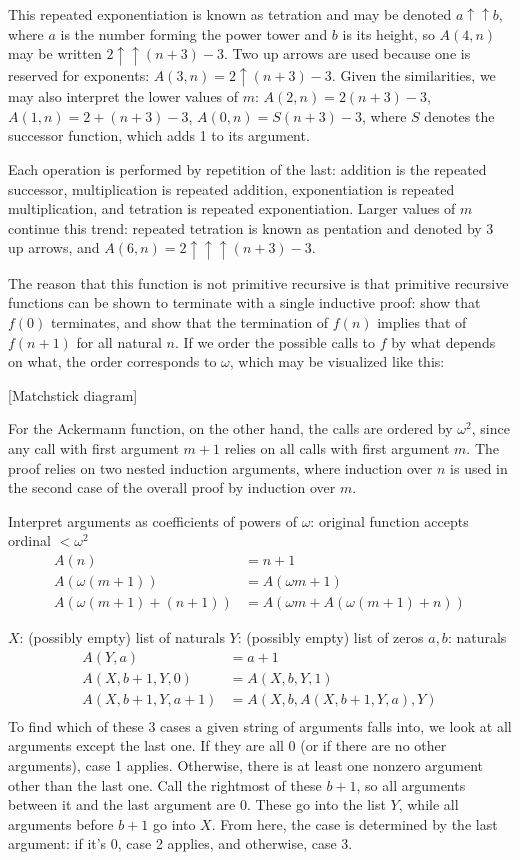 \documentclass{article}
\begin{document}
This repeated exponentiation is known as tetration
and may be denoted $a \uparrow \uparrow b$,
where $a$ is the number forming the power tower
and $b$ is its height,
so $A(4, n)$ may be written $2\uparrow\uparrow(n+3)-3$.
Two up arrows are used because one is reserved for exponents:
$A(3, n) = 2\uparrow(n+3)-3$.
Given the similarities,
we may also interpret the lower values of $m$:
$A(2, n) = 2(n+3)-3$, $A(1, n) = 2+(n+3)-3$, $A(0, n) = S(n+3)-3$,
where $S$ denotes the successor function,
which adds 1 to its argument.

Each operation is performed by repetition of the last:
addition is the repeated successor,
multiplication is repeated addition,
exponentiation is repeated multiplication,
and tetration is repeated exponentiation.
Larger values of $m$ continue this trend:
repeated tetration is known as pentation and denoted by 3 up arrows,
and $A(6, n) = 2\uparrow\uparrow\uparrow(n+3)-3$.

The reason that this function is not primitive recursive
is that primitive recursive functions can be shown to terminate with a single inductive proof:
show that $f(0)$ terminates,
and show that the termination of $f(n)$ implies that of $f(n+1)$ for all natural $n$.
If we order the possible calls to $f$ by what depends on what,
the order corresponds to $\omega$,
which may be visualized like this:

[Matchstick diagram]

For the Ackermann function, on the other hand,
the calls are ordered by $\omega^2$,
since any call with first argument $m+1$
relies on all calls with first argument $m$.
The proof relies on two nested induction arguments,
where induction over $n$ is used in the second case
of the overall proof by induction over $m$.

Interpret arguments as coefficients of powers of $\omega$:
original function accepts ordinal $<\omega^2$
\begin{align*}
  A(n) &= n+1 \\
  A(\omega(m+1)) &= A(\omega m+1) \\
  A(\omega(m+1)+(n+1)) &= A(\omega m+A(\omega(m+1)+n))
\end{align*}

$X$: (possibly empty) list of naturals
$Y$: (possibly empty) list of zeros
$a, b$: naturals
\begin{align*}
  A(Y, a) &= a+1 \\
  A(X, b+1, Y, 0) &= A(X, b, Y, 1) \\
  A(X, b+1, Y, a+1) &= A(X, b, A(X, b+1, Y, a), Y) \\
\end{align*}
To find which of these 3 cases a given string of arguments falls into,
we look at all arguments except the last one.
If they are all 0 (or if there are no other arguments), case 1 applies.
Otherwise, there is at least one nonzero argument other than the last one.
Call the rightmost of these $b+1$,
so all arguments between it and the last argument are 0.
These go into the list $Y$,
while all arguments before $b+1$ go into $X$.
From here, the case is determined by the last argument:
if it's 0, case 2 applies,
and otherwise, case 3.
\end{document}
